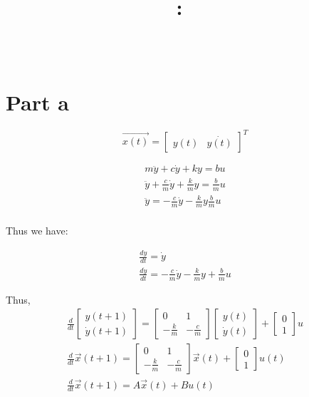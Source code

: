 \documentclass[12pt]{article}
\title{
\vspace{2in}
\textmd{\textbf{\hmwkClass:\ \hmwkTitle}}\\
}
\author{\textbf{\hmwkAuthorName} \\
        \textbf{\hmwkAuthorID}
        }
\date{} %
\begin{document}
\maketitle
\newpage
\section{Part a}

$$\vec{x(t)} = \begin{bmatrix} y(t) & \dot{y(t)}\end{bmatrix}^T$$

\begin{eqnarray*}
m\ddot{y} + c\dot{y} + ky = bu\\
\ddot{y} + \frac{c}{m}\dot{y} + \frac{k}{m}y = \frac{b}{m}u\\
\ddot{y} = -\frac{c}{m}\dot{y} - \frac{k}{m}y \frac{b}{m}u\\
\end{eqnarray*}

Thus we have:

\begin{eqnarray*}
\frac{dy}{dt} = \dot{y}\\
\frac{d\dot{y}}{dt} = -\frac{c}{m}\dot{y} - \frac{k}{m}y + \frac{b}{m}u
\end{eqnarray*}

Thus,
\begin{eqnarray*}
\frac{d}{dt}\begin{bmatrix} y(t+1) \\ \dot{y}(t+1)  \end{bmatrix} = \begin{bmatrix} 0 & 1\\ -\frac{k}{m} & -\frac{c}{m} \end{bmatrix} \begin{bmatrix} y(t) \\ \dot{y}(t) \end{bmatrix} + \begin{bmatrix} 0 \\ 1 \end{bmatrix} u \\
\frac{d}{dt}\vec{x}(t+1) = \begin{bmatrix} 0 & 1\\ -\frac{k}{m} & -\frac{c}{m} \end{bmatrix} \vec{x}(t) + \begin{bmatrix} 0 \\ 1 \end{bmatrix} u(t) \\
\frac{d}{dt}\vec{x}(t+1) = A \vec{x}(t) + B u(t) \\
\end{eqnarray*}
\end{document}
